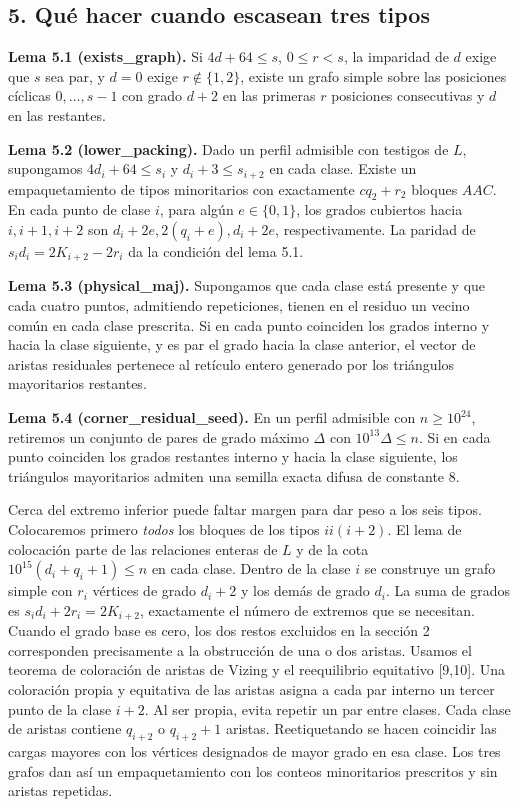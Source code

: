 \documentclass[spanish,11pt,a4paper]{article}
\begin{document}
\subsection{5. Qué hacer cuando escasean tres tipos}\label{quuxe9-hacer-cuando-escasean-tres-tipos}

\textbf{Lema 5.1 (exists\_graph).} Si \(4d+64\le s\), \(0\le r<s\), la imparidad de \(d\) exige que \(s\) sea par, y \(d=0\) exige \(r\notin\{1,2\}\), existe un grafo simple sobre las posiciones cíclicas \(0,\ldots,s-1\) con grado \(d+2\) en las primeras \(r\) posiciones consecutivas y \(d\) en las restantes.

\textbf{Lema 5.2 (lower\_packing).} Dado un perfil admisible con testigos de \(L\), supongamos \(4d_i+64\le s_i\) y \(d_i+3\le s_{i+2}\) en cada clase. Existe un empaquetamiento de tipos minoritarios con exactamente \(cq_2+r_2\) bloques \(AAC\). En cada punto de clase \(i\), para algún \(e\in\{0,1\}\), los grados cubiertos hacia \(i,i+1,i+2\) son \(d_i+2e,2(q_i+e),d_i+2e\), respectivamente. La paridad de \(s_i d_i=2K_{i+2}-2r_i\) da la condición del lema 5.1.

\textbf{Lema 5.3 (physical\_maj).} Supongamos que cada clase está presente y que cada cuatro puntos, admitiendo repeticiones, tienen en el residuo un vecino común en cada clase prescrita. Si en cada punto coinciden los grados interno y hacia la clase siguiente, y es par el grado hacia la clase anterior, el vector de aristas residuales pertenece al retículo entero generado por los triángulos mayoritarios restantes.

\textbf{Lema 5.4 (corner\_residual\_seed).} En un perfil admisible con \(n\ge10^{24}\), retiremos un conjunto de pares de grado máximo \(\Delta\) con \(10^{13}\Delta\le n\). Si en cada punto coinciden los grados restantes interno y hacia la clase siguiente, los triángulos mayoritarios admiten una semilla exacta difusa de constante 8.

Cerca del extremo inferior puede faltar margen para dar peso a los seis tipos. Colocaremos primero \emph{todos} los bloques de los tipos \(ii(i+2)\). El lema de colocación parte de las relaciones enteras de \(L\) y de la cota \(10^{15}(d_i+q_i+1)\le n\) en cada clase. Dentro de la clase \(i\) se construye un grafo simple con \(r_i\) vértices de grado \(d_i+2\) y los demás de grado \(d_i\). La suma de grados es \(s_id_i+2r_i=2K_{i+2}\), exactamente el número de extremos que se necesitan. Cuando el grado base es cero, los dos restos excluidos en la sección 2 corresponden precisamente a la obstrucción de una o dos aristas. Usamos el teorema de coloración de aristas de Vizing y el reequilibrio equitativo {[}9,10{]}. Una coloración propia y equitativa de las aristas asigna a cada par interno un tercer punto de la clase \(i+2\). Al ser propia, evita repetir un par entre clases. Cada clase de aristas contiene \(q_{i+2}\) o \(q_{i+2}+1\) aristas. Reetiquetando se hacen coincidir las cargas mayores con los vértices designados de mayor grado en esa clase. Los tres grafos dan así un empaquetamiento con los conteos minoritarios prescritos y sin aristas repetidas.
\end{document}
